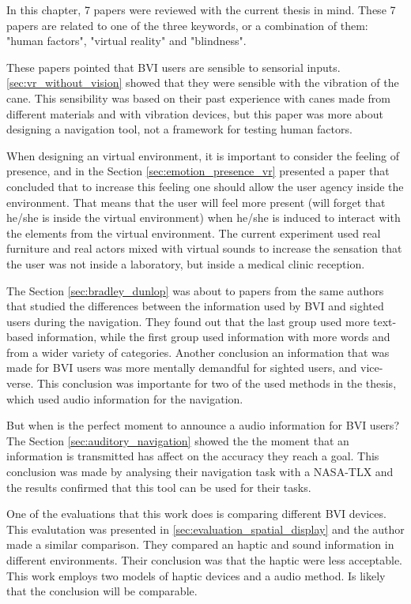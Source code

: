 In this chapter, 7 papers were reviewed with the current thesis in mind. These 7 papers are related to one of the three keywords, or a combination of them: "human factors", "virtual reality" and "blindness".

These papers pointed that BVI users are sensible to sensorial inputs. \ref{sec:vr_without_vision} showed that they were sensible with the vibration of the cane. This sensibility was based on their past experience with canes made from different materials and with vibration devices, but this paper was more about designing a navigation tool, not a framework for testing human factors.

When designing an virtual environment, it is important to consider the feeling of presence, and in the Section \ref{sec:emotion_presence_vr} presented a paper that concluded that to increase this feeling one should allow the user agency inside the environment. That means that the user will feel more present (will forget that he/she is inside the virtual environment) when he/she is induced to interact with the elements from the virtual environment. The current experiment used real furniture and real actors mixed with virtual sounds to increase the sensation that the user was not inside a laboratory, but inside a medical clinic reception.

The Section \ref{sec:bradley_dunlop} was about to papers from the same authors that studied the differences between the information used by BVI and sighted users during the navigation. They found out that the last group used more text-based information, while the first group used information with more words and from a wider variety of categories. Another conclusion an information that was made for BVI users was more mentally demandful for sighted users, and vice-verse. This conclusion was importante for two of the used methods in the thesis, which used audio information for the navigation.

But when is the perfect moment to announce a audio information for BVI users? The Section \ref{sec:auditory_navigation} showed the the moment that an information is transmitted has affect on the accuracy they reach a goal. This conclusion was made by analysing their navigation task with a NASA-TLX and the results confirmed that this tool can be used for their tasks.

One of the evaluations that this work does is comparing different BVI devices. This evalutation was presented in \ref{sec:evaluation_spatial_display} and the author made a similar comparison. They compared an haptic and sound information in different environments. Their conclusion was that the haptic were less acceptable. This work employs two models of haptic devices and a audio method. Is likely that the conclusion will be comparable.

